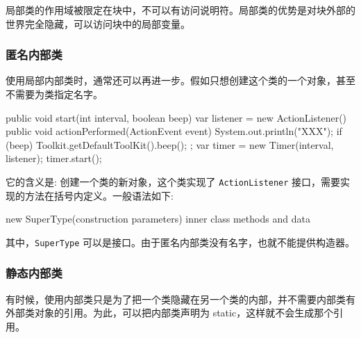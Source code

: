局部类的作用域被限定在块中，不可以有访问说明符。局部类的优势是对块外部的世界完全隐藏，可以访问块中的局部变量。

\subsubsection{匿名内部类}

使用局部内部类时，通常还可以再进一步。假如只想创建这个类的一个对象，甚至不需要为类指定名字。

\begin{Java}
public void start(int interval, boolean beep) {
    var listener = new ActionListener() {
            public void actionPerformed(ActionEvent event) {
                System.out.println("XXX");
                if (beep) Toolkit.getDefaultToolKit().beep();
            }
        };
    var timer = new Timer(interval, listener);
    timer.start();
}
\end{Java}

它的含义是: 创建一个类的新对象，这个类实现了 \texttt{ActionListener} 接口，需要实现的方法在括号内定义。一般语法如下:

\begin{Java}
new SuperType(construction parameters) {
    inner class methods and data
}
\end{Java}

其中，\texttt{SuperType} 可以是接口。由于匿名内部类没有名字，也就不能提供构造器。

\subsubsection{静态内部类}

有时候，使用内部类只是为了把一个类隐藏在另一个类的内部，并不需要内部类有外部类对象的引用。为此，可以把内部类声明为 static，这样就不会生成那个引用。

\newpage